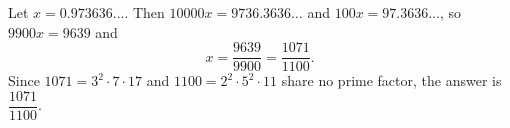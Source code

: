 Let $x=0.973636\ldots$. Then $10000x=9736.3636\ldots$ and $100x=97.3636\ldots$, so $9900x=9639$ and
\[x=\dfrac{9639}{9900}=\dfrac{1071}{1100}.\]
Since $1071=3^2\cdot7\cdot17$ and $1100=2^2\cdot5^2\cdot11$ share no prime factor, the answer is $\boxed{\dfrac{1071}{1100}}$.
